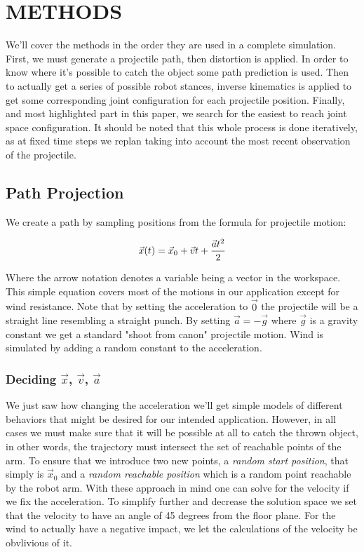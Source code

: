 \documentclass[letterpaper, 10 pt, conference]{ieeeconf}  %
\begin{document}
\section{METHODS}

We'll cover the methods in the order they are used in a complete simulation.
First, we must generate a projectile path, then distortion is applied. In order
to know where it's possible to catch the object some path prediction is used.
Then to actually get a series of possible robot stances, inverse kinematics is
applied to get some corresponding joint configuration for each projectile
position. Finally, and most highlighted part in this paper, we search for the
easiest to reach joint space configuration. It should be noted that this whole
process is done iteratively, as at fixed time steps we replan taking into account
the most recent observation of the projectile.

\subsection{Path Projection}

We create a path by sampling positions from the formula for projectile motion:

\[
  \vec{x}(t) = \vec{x}_0 + \vec{v}t + {\vec{a}t^2 \over 2}
\]

Where the arrow notation denotes a variable being a vector in the
workspace.  This simple equation covers most of the motions in our
application except for wind resistance. Note that by setting the
acceleration to $\vec{0}$ the projectile will be a straight line
resembling a straight punch. By setting $\vec{a} = -\vec{g}$ where
$\vec{g}$ is a gravity constant we get a standard "shoot from canon"
projectile motion. Wind is simulated by adding a random constant to
the acceleration.

\subsubsection{Deciding $\vec{x}$, $\vec{v}$, $\vec{a}$}

We just saw how changing the acceleration we'll get simple models of
different behaviors that might be desired for our intended application.
However, in all cases we must make sure that it will be possible at all
to catch the thrown object, in other words, the trajectory must
intersect the set of reachable points of the arm. To ensure that we
introduce two new points, a \emph{random start position}, that simply is
$\vec{x}_0$ and a \emph{random reachable position} which is a random
point reachable by the robot arm. With these approach in mind one can
solve for the velocity if we fix the acceleration. To simplify further
and decrease the solution space we set that the velocity to have an
angle of 45 degrees from the floor plane. For the wind to actually have
a negative impact, we let the calculations of the velocity be obvlivious
of it.
\end{document}
